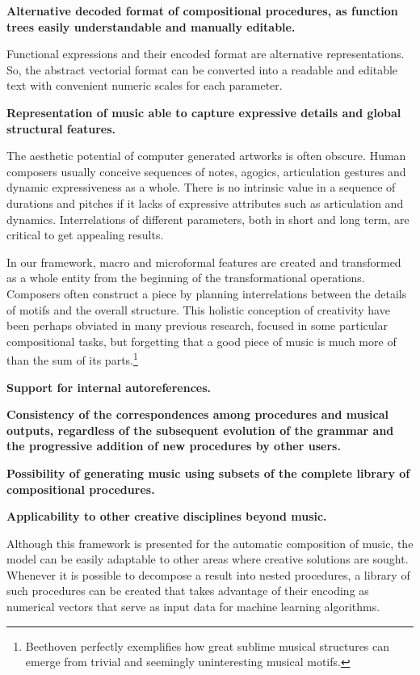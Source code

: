 \documentclass{article}
\begin{document}
\textbf{Alternative decoded format of compositional procedures, as function trees easily understandable and manually editable.}

Functional expressions and their encoded format are alternative representations. So, the abstract vectorial format can be converted into a readable and editable text with convenient numeric scales for each parameter.

\textbf{Representation of music able to capture expressive details and global structural features.} 

The aesthetic potential of computer generated artworks is often obscure. Human composers usually conceive sequences of notes, agogics, articulation gestures and dynamic expressiveness as a whole. There is no intrinsic value in a sequence of durations and pitches if it lacks of expressive attributes such as articulation and dynamics. Interrelations of different parameters, both in short and long term, are critical to get appealing results.

In our framework, macro and microformal features are created and transformed as a whole entity from the beginning of the transformational operations. Composers often construct a piece by planning interrelations between the details of motifs and the overall structure. This holistic conception of creativity have been perhaps obviated in many previous research, focused in some particular compositional tasks, but forgetting that a good piece of music is much more of than the sum of its parts.\footnote{Beethoven perfectly exemplifies how great sublime musical structures can emerge from trivial and seemingly uninteresting musical motifs.}

\textbf{Support for internal autoreferences.}

\textbf{Consistency of the correspondences among procedures and musical outputs, regardless of the subsequent evolution of the grammar and the progressive addition of new procedures by other users.}

\textbf{Possibility of generating music using subsets of the complete library of compositional procedures.}

\textbf{Applicability to other creative disciplines beyond music.}

Although this framework is presented for the automatic composition of music, the model can be easily adaptable to other areas where creative solutions are sought. Whenever it is possible to decompose a result into nested procedures, a library of such procedures can be created that takes advantage of their encoding as numerical vectors that serve as input data for machine learning algorithms.
\end{document}
